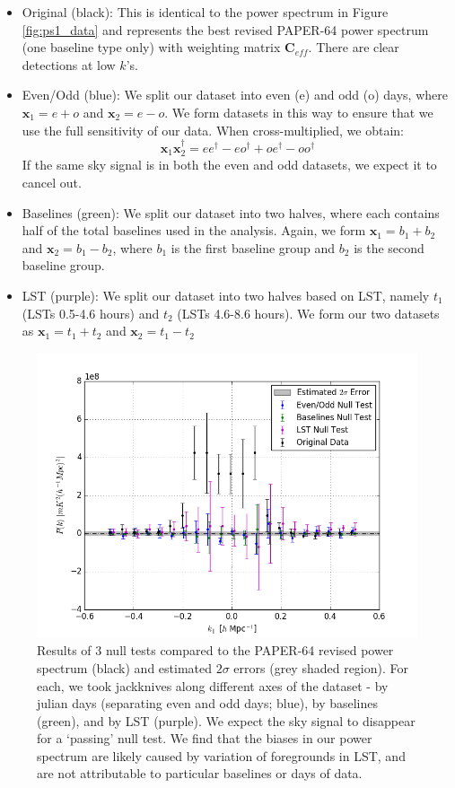\documentclass[preprint2,numberedappendix,tighten]{aastex6}  %
\begin{document}
\begin{itemize}
\item Original (black): This is identical to the power spectrum in Figure \ref{fig:ps1_data} and represents the best revised PAPER-64 power spectrum (one baseline type only) with weighting matrix $\textbf{C}_{eff}$. There are clear detections at low $k$'s.
\item Even/Odd (blue): We split our dataset into even (e) and odd (o) days, where $\textbf{x}_{1} = e + o$ and $\textbf{x}_{2} = e - o$. We form datasets in this way to ensure that we use the full sensitivity of our data. When cross-multiplied, we obtain:
\begin{equation}
\textbf{x}_{1}\textbf{x}_{2}^{\dagger} = ee^{\dagger} - eo^{\dagger} + oe^{\dagger} - oo^{\dagger}
\end{equation}
If the same sky signal is in both the even and odd datasets, we expect it to cancel out.
\item Baselines (green): We split our dataset into two halves, where each contains half of the total baselines used in the analysis. Again, we form $\textbf{x}_{1} = b_{1} + b_{2}$ and $\textbf{x}_{2} = b_{1} - b_{2}$, where $b_{1}$ is the first baseline group and $b_{2}$ is the second baseline group.
\item LST (purple): We split our dataset into two halves based on LST, namely $t_{1}$ (LSTs 0.5-4.6 hours) and $t_{2}$ (LSTs 4.6-8.6 hours). We form our two datasets as $\textbf{x}_{1} = t_{1} + t_{2}$ and $\textbf{x}_{2} = t_{1} - t_{2}$
\end{itemize}

\begin{figure}
	\centering
	\includegraphics[width=\columnwidth]{plots/null.png}
	\caption{Results of $3$ null tests compared to the PAPER-64 revised power spectrum (black) and estimated $2\sigma$ errors (grey shaded region). For each, we took jackknives along different axes of the dataset - by julian days (separating even and odd days; blue), by baselines (green), and by LST (purple). We expect the sky signal to disappear for a `passing' null test. We find that the biases in our power spectrum are likely caused by variation of foregrounds in LST, and are not attributable to particular baselines or days of data.}
	\label{fig:null}
\end{figure}
\end{document}
